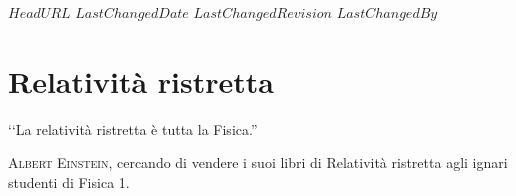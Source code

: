 \svnidlong
{$HeadURL$}
{$LastChangedDate$}
{$LastChangedRevision$}
{$LastChangedBy$}

\chapter{Relatività ristretta}

\begin{introduction}
	‘‘La relatività ristretta è tutta la Fisica.''
	\begin{flushright}
		\textsc{Albert Einstein,} cercando di vendere i suoi libri di Relatività ristretta agli ignari studenti di Fisica 1.
	\end{flushright}
\end{introduction}

%
%
%
%
%
%
%
%		
%
%
%
